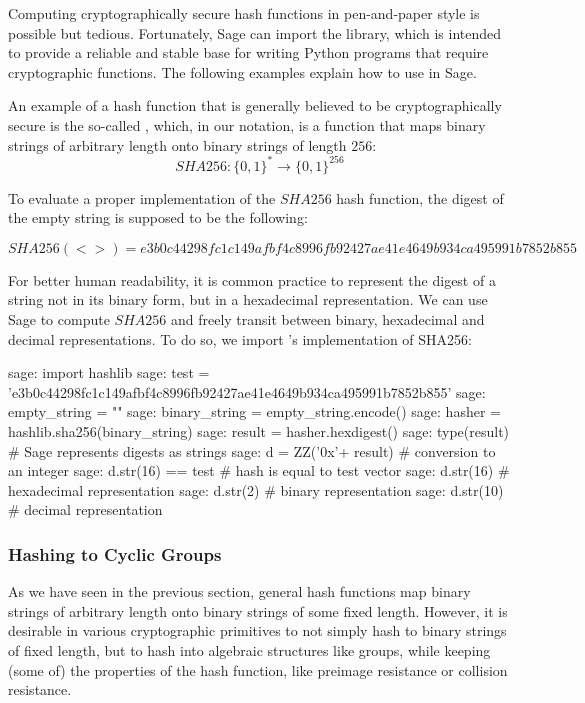 Computing cryptographically secure hash functions in pen-and-paper style is possible but tedious. Fortunately, Sage can import the  library, which is intended to provide a reliable and stable base for writing Python programs that require cryptographic functions. The following examples explain how to use  in Sage.

\begin{example}\label{ex:SHA256}An example of a hash function that is generally believed to be cryptographically secure is the so-called , which, in our notation, is a function that maps binary strings of arbitrary length onto binary strings of length $256$:
\begin{equation}
SHA256: \{0,1\}^* \to \{0,1\}^{256}
\end{equation}

 To evaluate a proper implementation of the $SHA256$ hash function, the digest of the empty string is supposed to be the following:
 
\begin{equation}
SHA256(<>)= {\scriptstyle e3b0c44298fc1c149afbf4c8996fb92427ae41e4649b934ca495991b7852b855}
\end{equation}

For better human readability, it is common practice to represent the digest of a string not in its binary form, but in a hexadecimal representation. We can use Sage to compute $SHA256$ and freely transit between binary, hexadecimal and decimal representations. To do so, we import 's implementation of SHA256:
\begin{sagecommandline}
sage: import hashlib
sage: test = 'e3b0c44298fc1c149afbf4c8996fb92427ae41e4649b934ca495991b7852b855' 
sage: empty_string = ""
sage: binary_string = empty_string.encode()
sage: hasher = hashlib.sha256(binary_string) 
sage: result = hasher.hexdigest()
sage: type(result)	# Sage represents digests as strings
sage: d = ZZ('0x'+ result) # conversion to an integer
sage: d.str(16) == test	# hash is equal to test vector
sage: d.str(16) # hexadecimal representation
sage: d.str(2) # binary representation
sage: d.str(10) # decimal representation
\end{sagecommandline}
\end{example}

\subsubsection{Hashing to Cyclic Groups} As we have seen in the previous section, general hash functions map binary strings of arbitrary length onto binary strings of some fixed length. However, it is desirable in various cryptographic primitives to not simply hash to binary strings of fixed length, but to hash into algebraic structures like groups, while keeping (some of) the properties of the hash function, like preimage resistance or collision resistance.


